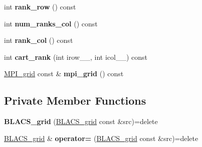 \begin{DoxyCompactItemize}
\item 
\hypertarget{classsddk_1_1_b_l_a_c_s__grid_ab9bce668bbf962375c5040655dd1ed80}{}int {\bfseries rank\+\_\+row} () const \label{classsddk_1_1_b_l_a_c_s__grid_ab9bce668bbf962375c5040655dd1ed80}

\item 
\hypertarget{classsddk_1_1_b_l_a_c_s__grid_a3cf057f0eed64c46448948c1f08897a5}{}int {\bfseries num\+\_\+ranks\+\_\+col} () const \label{classsddk_1_1_b_l_a_c_s__grid_a3cf057f0eed64c46448948c1f08897a5}

\item 
\hypertarget{classsddk_1_1_b_l_a_c_s__grid_a07613fc7d30dee2aa00eb625de2e77bd}{}int {\bfseries rank\+\_\+col} () const \label{classsddk_1_1_b_l_a_c_s__grid_a07613fc7d30dee2aa00eb625de2e77bd}

\item 
\hypertarget{classsddk_1_1_b_l_a_c_s__grid_a56304d1d8a1b785c4ff55fc02011635e}{}int {\bfseries cart\+\_\+rank} (int irow\+\_\+\+\_\+, int icol\+\_\+\+\_\+) const \label{classsddk_1_1_b_l_a_c_s__grid_a56304d1d8a1b785c4ff55fc02011635e}

\item 
\hypertarget{classsddk_1_1_b_l_a_c_s__grid_a82a76493b492c5f2f8e60a0baedaaea9}{}\hyperlink{classsddk_1_1_m_p_i__grid}{M\+P\+I\+\_\+grid} const \& {\bfseries mpi\+\_\+grid} () const \label{classsddk_1_1_b_l_a_c_s__grid_a82a76493b492c5f2f8e60a0baedaaea9}

\end{DoxyCompactItemize}
\subsection*{Private Member Functions}
\begin{DoxyCompactItemize}
\item 
\hypertarget{classsddk_1_1_b_l_a_c_s__grid_ab443980167607c475d070e86b636a8de}{}{\bfseries B\+L\+A\+C\+S\+\_\+grid} (\hyperlink{classsddk_1_1_b_l_a_c_s__grid}{B\+L\+A\+C\+S\+\_\+grid} const \&src)=delete\label{classsddk_1_1_b_l_a_c_s__grid_ab443980167607c475d070e86b636a8de}

\item 
\hypertarget{classsddk_1_1_b_l_a_c_s__grid_aef676eb6d4bad755d9f9fa394ea9685c}{}\hyperlink{classsddk_1_1_b_l_a_c_s__grid}{B\+L\+A\+C\+S\+\_\+grid} \& {\bfseries operator=} (\hyperlink{classsddk_1_1_b_l_a_c_s__grid}{B\+L\+A\+C\+S\+\_\+grid} const \&src)=delete\label{classsddk_1_1_b_l_a_c_s__grid_aef676eb6d4bad755d9f9fa394ea9685c}

\end{DoxyCompactItemize}
